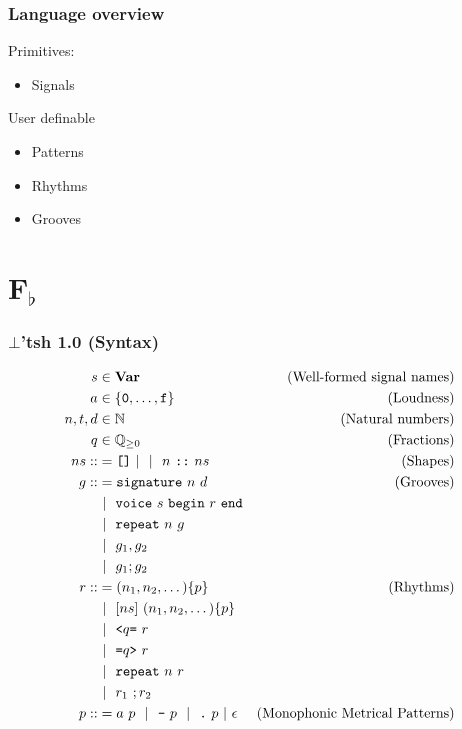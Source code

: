 \documentclass[dvipsnames]{beamer}
\def\Var{\ensuremath{\text{\bf Var}}}
\def\N{\ensuremath{\mathbb N}}
\def\OR{\ensuremath{\ |\ }}
\newcommand\LIT[1]{\ensuremath{\text{\tt #1}}}
\begin{document}
\begin{frame}
  \frametitle{Language overview}

  \begin{block}{Primitives:}
    \begin{itemize}
    \item Signals
    \end{itemize}
  \end{block}


  \begin{block}{User definable}
    \begin{itemize}
    \item Patterns
    \item Rhythms
    \item Grooves
    \end{itemize}
  \end{block}

\end{frame}

\section{F$_\flat$}
\begin{frame}[fragile]\frametitle{$\bot$'tsh 1.0 (Syntax)}
  \begin{center}
{\scriptsize
\begin{align*}
  s &\in \Var &\text{(Well-formed signal names)}\\ a &\in \{\LIT{0}, \dots,
  \LIT{f}\} &\text{(Loudness)}\\ n,t,d &\in \N &\text{(Natural numbers)}\\ q
  &\in \mathbb Q_{\geq 0} &\text{(Fractions)}\\ ns ::&=
  \LIT{[]}\ |\ \OR\ n\ \LIT{::}\ ns &\text{(Shapes)}\\ g ::&=
  \LIT{signature}\ n\ d
  &\text{(Grooves)}\\ &\OR\ \LIT{voice}\ s\ \LIT{begin}\ r\ \LIT{end}\\ &\OR\ \LIT{repeat}\ n\ g\\ &\OR\ g_1
  , g_2\\ &\OR\ g_1 ; g_2\\ r ::&= (n_1, n_2, \dots) \{p\}
  &\text{(Rhythms)}\\ &\OR\ [ns]\ (n_1, n_2, \dots)\{p\}\\ &\OR\ \LIT{<}
  q\LIT{=}\ r\\ &\OR\ \LIT{=}q\LIT{>}\ r\\ &\OR\ \LIT{repeat}\ n\ r\\ &\OR\ r_1\ ;
  r_2\\ p ::&=
  a\ p\ \OR\ \LIT{-}\ p\ \OR\ \LIT{.}\ p\ |\ \epsilon &\text{(Monophonic
    Metrical Patterns)}
\end{align*}
}
\end{center}
\end{frame}
\end{document}
